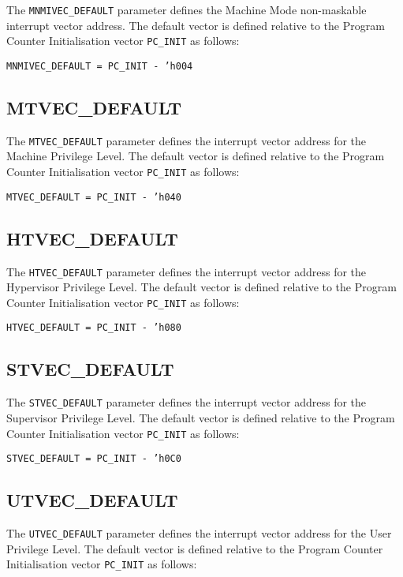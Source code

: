 The \texttt{MNMIVEC\_DEFAULT} parameter defines the Machine Mode non-maskable
interrupt vector address. The default vector is defined relative to the
Program Counter Initialisation vector \texttt{PC\_INIT} as follows:

\texttt{MNMIVEC\_DEFAULT = PC\_INIT - 'h004}

\subsection{MTVEC\_DEFAULT}\label{mtvec_default}

The \texttt{MTVEC\_DEFAULT} parameter defines the interrupt vector address for
the Machine Privilege Level. The default vector is defined relative to
the Program Counter Initialisation vector \texttt{PC\_INIT} as follows:

\texttt{MTVEC\_DEFAULT = PC\_INIT - 'h040}

\subsection{HTVEC\_DEFAULT}\label{htvec_default}

The \texttt{HTVEC\_DEFAULT} parameter defines the interrupt vector address for
the Hypervisor Privilege Level. The default vector is defined relative
to the Program Counter Initialisation vector \texttt{PC\_INIT} as follows:

\texttt{HTVEC\_DEFAULT = PC\_INIT - 'h080}

\subsection{STVEC\_DEFAULT}\label{stvec_default}

The \texttt{STVEC\_DEFAULT} parameter defines the interrupt vector address for
the Supervisor Privilege Level. The default vector is defined relative
to the Program Counter Initialisation vector \texttt{PC\_INIT} as follows:

\texttt{STVEC\_DEFAULT = PC\_INIT - 'h0C0}

\subsection{UTVEC\_DEFAULT}\label{utvec_default}

The \texttt{UTVEC\_DEFAULT} parameter defines the interrupt vector address for
the User Privilege Level. The default vector is defined relative to the
Program Counter Initialisation vector \texttt{PC\_INIT} as follows:

